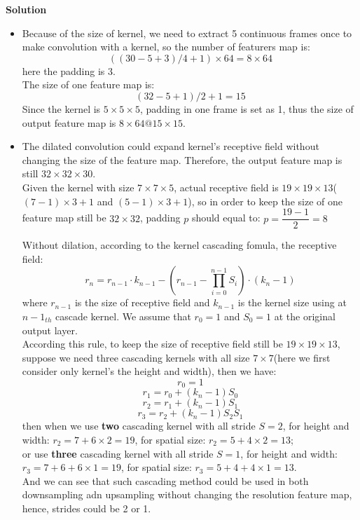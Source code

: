\documentclass[12pt]{article}%
\begin{document}
\textbf{Solution}
\begin{itemize}
	\item Because of the size of kernel, we need to extract 5 continuous frames once to make convolution with a kernel, so the number of featurers map is:
	\[ ((30-5+3)/4+1)\times64=8\times64 \]
	here the padding is 3.\\
	The size of one feature map is:
	\[ (32-5+1)/2+1=15 \]
	 Since the kernel is $5\times 5\times 5$, padding in one frame is set as 1, thus the size of output feature map is $ 8\times64@ 15\times15 $.
	 \item The dilated convolution could expand kernel's receptive field without changing the size of the feature map. Therefore, the output feature map is still $ 32\times32\times30 $.\\
	 Given the kernel with size $7\times 7\times 5$, actual receptive field is $ 19\times19\times13 $($ (7-1)\times3+1 $ and $ (5-1)\times3+1 $), so in order to keep the size of one feature map still be $ 32\times32 $, padding $ p $ should equal to: $ p=\dfrac{19-1}{2} =8$
	 
	 Without dilation, according to the kernel cascading fomula, the receptive field:
	 \[ r_n=r_{n-1}\cdot k_{n-1}-(r_{n-1}-\prod_{i=0}^{n-1}S_{i})\cdot(k_n-1) \]
	 where $ r_{n-1} $ is the size of receptive field and $ k_{n-1} $ is the kernel size using at $ n-1_{th} $ cascade kernel. We assume that $ r_0=1 $ and $ S_0=1 $ at the original output layer.\\
	 According this rule, to keep the size of receptive field still be $ 19\times19\times13 $, suppose we need three cascading kernels with all size $ 7\times7 $(here we first consider only kernel's the height and width), then we have:
	 \[ r_0=1  \]
	 \[ r_1=r_0+(k_n-1)S_0 \]
	 \[ r_2=r_1+(k_n-1)S_1\]
	 \[ r_3=r_2+(k_n-1)S_2S_1  \]
	 then when we use \textbf{two} cascading kernel with all stride $ S=2 $, for height and width: $ r_2=7+6\times2=19 $, for spatial size: $ r_2=5+4\times2=13 $;\\
	 or use \textbf{three } cascading kernel with all stride $ S=1 $, for height and width: $ r_3=7+6+6\times1=19 $, for spatial size: $ r_3=5+4+4\times1=13 $.\\
	 And we can see that such cascading method could be used in both downsampling adn upsampling without changing the resolution feature map, hence, strides could be 2 or 1.
\end{itemize}
\newpage
\end{document}
